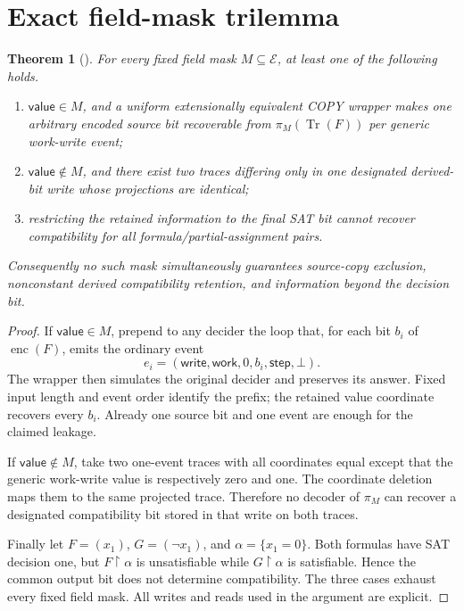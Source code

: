 \documentclass[11pt]{article}
\newtheorem{theorem}{Theorem}
\newcommand{\claim}[1]{\texttt{\detokenize{#1}}}
\begin{document}
\section{Exact field-mask trilemma}

\begin{theorem}[\claim{TRACE-FIELD-MASK-TRILEMMA1}]
For every fixed field mask \(M\subseteq\mathcal E\), at least one of the
following holds.
\begin{enumerate}[label=(\roman*)]
\item \(\mathsf{value}\in M\), and a uniform extensionally equivalent COPY
wrapper makes one arbitrary encoded source bit recoverable from
\(\pi_M(\operatorname{Tr}(F))\) per generic work-write event;
\item \(\mathsf{value}\notin M\), and there exist two traces differing only
in one designated derived-bit write whose projections are identical;
\item restricting the retained information to the final SAT bit cannot
recover compatibility for all formula/partial-assignment pairs.
\end{enumerate}
Consequently no such mask simultaneously guarantees source-copy exclusion,
nonconstant derived compatibility retention, and information beyond the
decision bit.
\end{theorem}

\begin{proof}
If \(\mathsf{value}\in M\), prepend to any decider the loop that, for each
bit \(b_i\) of \(\operatorname{enc}(F)\), emits the ordinary event
\[
 e_i=(\mathsf{write},\mathsf{work},0,b_i,\mathsf{step},\bot).
\]
The wrapper then simulates the original decider and preserves its answer.
Fixed input length and event order identify the prefix; the retained value
coordinate recovers every \(b_i\).  Already one source bit and one event are
enough for the claimed leakage.

If \(\mathsf{value}\notin M\), take two one-event traces with all coordinates
equal except that the generic work-write value is respectively zero and one.
The coordinate deletion maps them to the same projected trace.  Therefore no
decoder of \(\pi_M\) can recover a designated compatibility bit stored in
that write on both traces.

Finally let \(F=(x_1)\), \(G=(\neg x_1)\), and
\(\alpha=\{x_1=0\}\).  Both formulas have SAT decision one, but
\(F\!\upharpoonright\!\alpha\) is unsatisfiable while
\(G\!\upharpoonright\!\alpha\) is satisfiable.  Hence the common output bit
does not determine compatibility.  The three cases exhaust every fixed
field mask.  All writes and reads used in the argument are explicit.
\end{proof}
\end{document}
